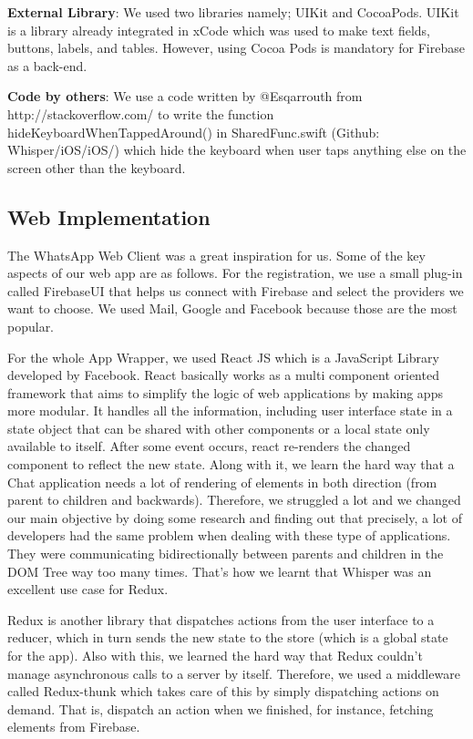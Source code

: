 \textbf{External Library}: We used two libraries namely; UIKit and CocoaPods. UIKit is a library already integrated in xCode which was used to make text fields, buttons, labels, and tables. However, using Cocoa Pods is mandatory for Firebase as a back-end.

\textbf{Code by others}: We use a code written by @Esqarrouth from http://stackoverflow.com/ to write the function hideKeyboardWhenTappedAround() in SharedFunc.swift (Github: Whisper/iOS/iOS/) which hide the keyboard when user taps anything else on the screen other than the keyboard.

\subsection{Web Implementation}

The WhatsApp Web Client was a great inspiration for us. Some of the key aspects of our web app are as follows. For the registration, we use a small plug-in called FirebaseUI that helps us connect with Firebase and select the providers we want to choose. We used Mail, Google and Facebook because those are the most popular.

For the whole App Wrapper, we used React JS which is a JavaScript Library developed by Facebook. React basically works as a multi component oriented framework that aims to simplify the logic of web applications by making apps more modular. It handles all the information, including user interface state in a state object that can be shared with other components or a local state only available to itself. After some event occurs, react re-renders the changed component to reflect the new state. Along with it, we learn the hard way that a Chat application needs a lot of rendering of elements in both direction (from parent to children and backwards). Therefore, we struggled a lot and we changed our main objective by doing some research and finding out that precisely, a lot of developers had the same problem when dealing with these type of applications. They were communicating bidirectionally between parents and children in the DOM Tree way too many times. That's how we learnt that Whisper was an excellent use case for Redux. 

Redux is another library that dispatches actions from the user interface to a reducer, which in turn sends the new state to the store (which is a global state for the app). Also with this, we learned the hard way that Redux couldn't manage asynchronous calls to a server by itself. Therefore, we used a middleware called Redux-thunk which takes care of this by simply dispatching actions on demand. That is, dispatch an action when we finished, for instance, fetching elements from Firebase.

